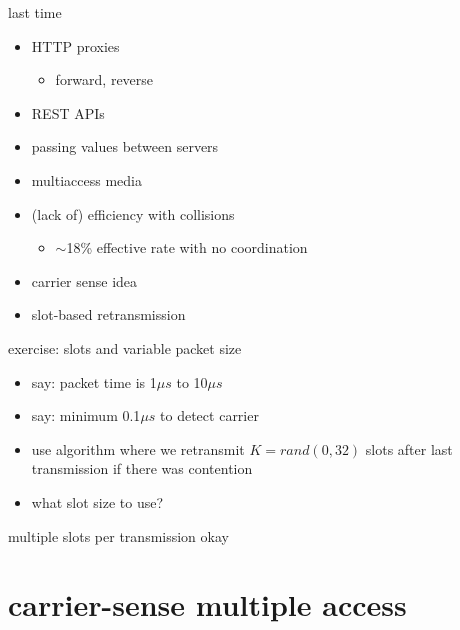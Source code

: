 \date{}
\title{}
\date{}
\usepackage{pgfplots}
\pgfplotsset{compat=1.14}

\begin{frame}
    \titlepage
\end{frame}

\begin{frame}{last time}
    \begin{itemize}
    \item HTTP proxies
        \begin{itemize}
        \item forward, reverse
        \end{itemize}
    \item REST APIs
    \item passing values between servers
    \item multiaccess media
    \item (lack of) efficiency with collisions
        \begin{itemize}
        \item $\sim$18\% effective rate with no coordination
        \end{itemize}
    \item carrier sense idea
    \item slot-based retransmission
    \end{itemize}
\end{frame}

\begin{frame}[label=slotEx]{exercise: slots and variable packet size}
    \begin{itemize}
    \item say: packet time is 1$\mu s$ to 10$\mu s$
    \item say: minimum 0.1$\mu s$ to detect carrier
    \item use algorithm where we retransmit $K=rand(0, 32)$ slots after last transmission if there was contention
    \item what slot size to use?
    \end{itemize}
\end{frame}

\begin{frame}{multiple slots per transmission okay}
\end{frame}

\section{carrier-sense multiple access}



